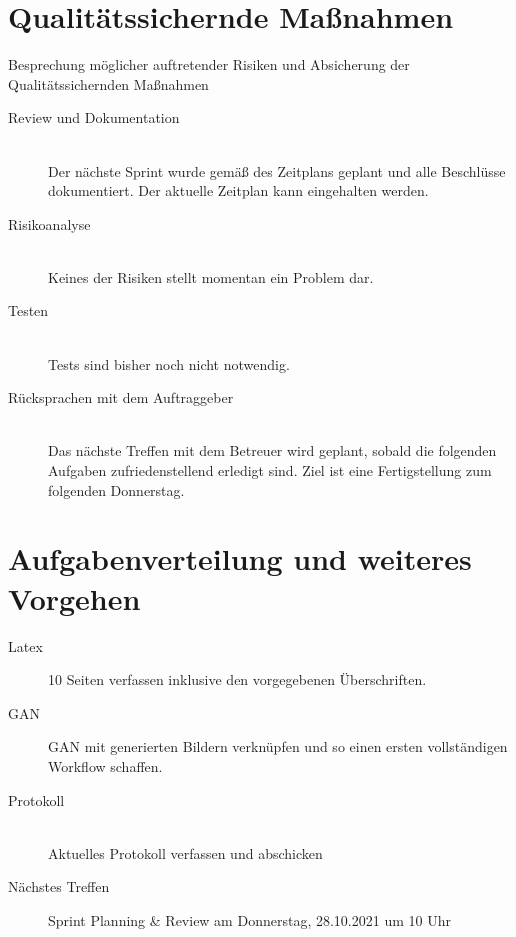 \section{Qualitätssichernde Maßnahmen}
Besprechung möglicher auftretender Risiken und Absicherung der Qualitätssichernden Maßnahmen
\begin{description}
	\item[Review und Dokumentation] \hfill \fullcheck\\
	Der nächste Sprint wurde gemäß des Zeitplans geplant und alle Beschlüsse dokumentiert. Der aktuelle Zeitplan kann eingehalten werden.
	\item[Risikoanalyse] \hfill \fullcheck \\ 
	Keines der Risiken stellt momentan ein Problem dar.
	\item[Testen] \hfill \fullcheck \\ 
	Tests sind bisher noch nicht notwendig.
	\item[Rücksprachen mit dem Auftraggeber] \hfill \fullcheck \\ 
	Das nächste Treffen mit dem Betreuer wird geplant, sobald die folgenden Aufgaben zufriedenstellend erledigt sind. Ziel ist eine Fertigstellung zum folgenden Donnerstag.
	
\end{description}

\section{Aufgabenverteilung und weiteres Vorgehen}
\begin{description}
	\item[Latex] 10 Seiten verfassen inklusive den vorgegebenen Überschriften.\hfill {}\\
	\item[GAN] GAN mit generierten Bildern verknüpfen und so einen ersten vollständigen Workflow schaffen. \hfill {}\\
	\item[Protokoll] \hfill {}\\Aktuelles Protokoll verfassen und abschicken 
	\item[Nächstes Treffen] Sprint Planning \& Review am Donnerstag, 28.10.2021 um 10 Uhr 
\end{description}

